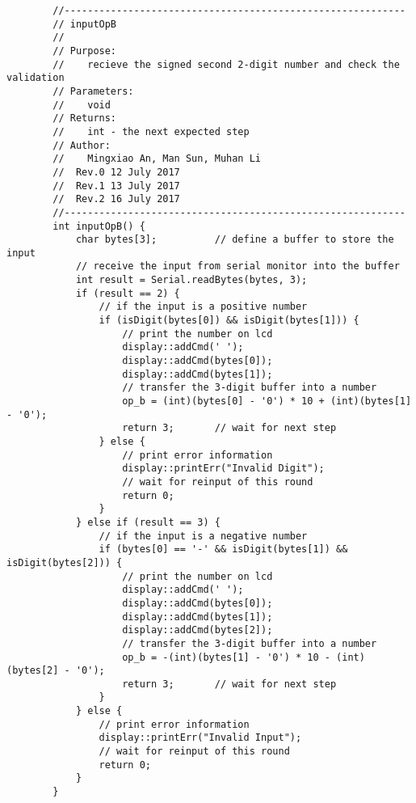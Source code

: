 \begin{verbatim}
        //-----------------------------------------------------------  
        // inputOpB 
        //  
        // Purpose:  
        //    recieve the signed second 2-digit number and check the validation
        // Parameters:  
        //    void 
        // Returns:  
        //    int - the next expected step   
        // Author:  
        //    Mingxiao An, Man Sun, Muhan Li
        //  Rev.0 12 July 2017
        //  Rev.1 13 July 2017
        //  Rev.2 16 July 2017
        //-----------------------------------------------------------
        int inputOpB() {
            char bytes[3];          // define a buffer to store the input
            // receive the input from serial monitor into the buffer
            int result = Serial.readBytes(bytes, 3);
            if (result == 2) {
                // if the input is a positive number
                if (isDigit(bytes[0]) && isDigit(bytes[1])) {
                    // print the number on lcd
                    display::addCmd(' ');
                    display::addCmd(bytes[0]);
                    display::addCmd(bytes[1]);
                    // transfer the 3-digit buffer into a number
                    op_b = (int)(bytes[0] - '0') * 10 + (int)(bytes[1] - '0');
                    return 3;       // wait for next step
                } else {
                    // print error information
                    display::printErr("Invalid Digit");
                    // wait for reinput of this round
                    return 0;
                }
            } else if (result == 3) {
                // if the input is a negative number
                if (bytes[0] == '-' && isDigit(bytes[1]) && isDigit(bytes[2])) {
                    // print the number on lcd
                    display::addCmd(' ');
                    display::addCmd(bytes[0]);
                    display::addCmd(bytes[1]);
                    display::addCmd(bytes[2]);
                    // transfer the 3-digit buffer into a number
                    op_b = -(int)(bytes[1] - '0') * 10 - (int)(bytes[2] - '0');
                    return 3;       // wait for next step
                }
            } else {
                // print error information
                display::printErr("Invalid Input");
                // wait for reinput of this round
                return 0;
            }
        }


\end{verbatim}

